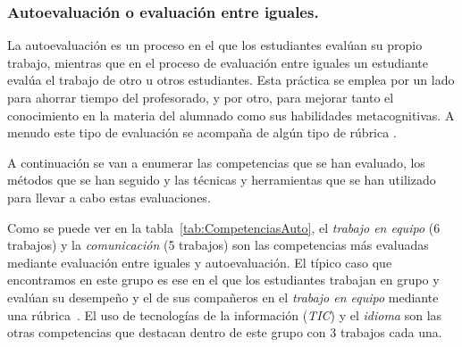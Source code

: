 \subsubsection{Autoevaluación o evaluación entre iguales.}

La autoevaluación es un proceso en el que los estudiantes evalúan su propio trabajo, mientras que  en el proceso de evaluación entre iguales un estudiante evalúa el trabajo de otro u otros estudiantes. Esta práctica se emplea por un lado para ahorrar tiempo del profesorado, y por otro, para mejorar tanto el conocimiento en la materia del alumnado como sus habilidades metacognitivas. A menudo este tipo de evaluación se acompaña de algún tipo de rúbrica \cite{malehorn1994ten}.

A continuación se van a enumerar las competencias que se han evaluado, los métodos que se han seguido y las técnicas y herramientas que se han utilizado para llevar a cabo estas evaluaciones.

Como se puede ver en la tabla~\ref{tab:CompetenciasAuto}, el \emph{trabajo en equipo} (6 trabajos) y la \emph{comunicación} (5 trabajos) son las competencias más evaluadas mediante evaluación entre iguales y autoevaluación. El típico caso que encontramos en este grupo es ese en el que los estudiantes trabajan en grupo y evalúan su desempeño y el de sus compañeros en el \emph{trabajo en equipo} mediante una rúbrica~\cite{ficapal2015learning}.
El uso de tecnologías de la información (\emph{TIC}) y el \emph{idioma} son las otras competencias que destacan dentro de este grupo con 3 trabajos cada una. 

